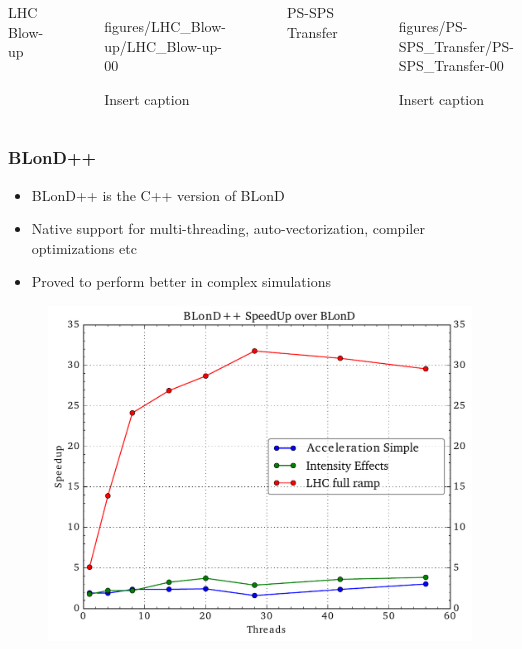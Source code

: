 \begin{frame}
		\begin{columns}[t]
			\centering
			LHC Blow-up\\
			\begin{figure}[h]
				\hspace{-12pt}
				 {figures/LHC_Blow-up/LHC_Blow-up-}{0}{0} %
				\caption*{Insert caption}
			\end{figure}
			
			\centering
			PS-SPS Transfer\\
			\begin{figure}[h]
				 {figures/PS-SPS_Transfer/PS-SPS_Transfer-}{0}{0} %
				\caption*{Insert caption}
			\end{figure}
		\end{columns}
\end{frame}


\begin{frame}
	\frametitle{BLonD++}
	{ \small
	\begin{itemize}
		\item BLonD++ is the C++ version of BLonD
		\item Native support for multi-threading, auto-vectorization, compiler optimizations etc
		\item Proved to perform better in complex simulations
	\end{itemize}
	}
	\begin{figure}
		\hspace{-150pt}	
		\includegraphics[width=.5\textwidth]{figures/BLonDpp-speedup2}
	\end{figure}
\end{frame}

